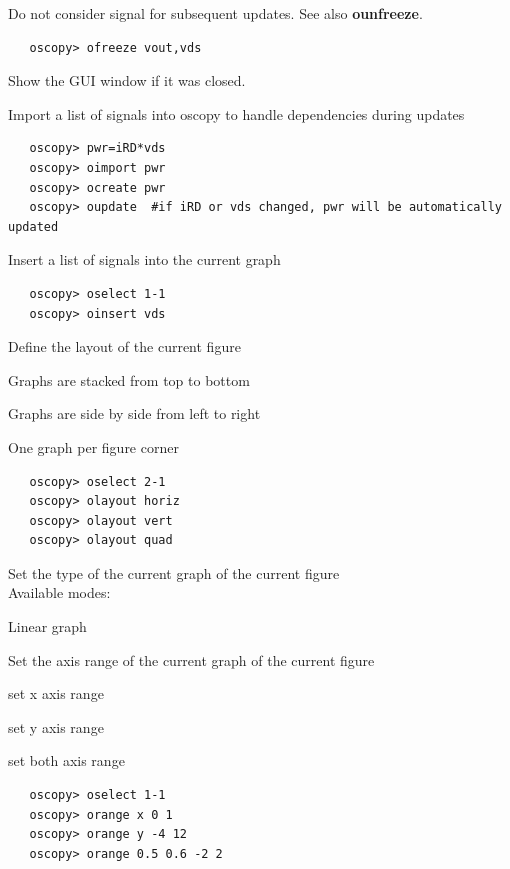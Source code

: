 \documentclass[a4paper,11pt]{report}
\renewenvironment{description}{%
\begin{basedescript}{%
\renewcommand{\makelabel}[1]{\bfseries##1}%
}%
}{%
\end{basedescript}%
}
\begin{document}
   Do not consider signal for subsequent updates. See also \textbf{ounfreeze}.
\begin{lstlisting}
   oscopy> ofreeze vout,vds
\end{lstlisting}

   Show the GUI window if it was closed.

   Import a list of signals into oscopy to handle dependencies during updates
\begin{lstlisting}
   oscopy> pwr=iRD*vds
   oscopy> oimport pwr
   oscopy> ocreate pwr
   oscopy> oupdate  #if iRD or vds changed, pwr will be automatically updated
\end{lstlisting}

   Insert a list of signals into the current graph
\begin{lstlisting}
   oscopy> oselect 1-1
   oscopy> oinsert vds
\end{lstlisting}

   Define the layout of the current figure
   \begin{description}
   \item[olayout horiz] Graphs are stacked from top to bottom
   \item[olayout vert] Graphs are side by side from left to right
   \item[olayout quad] One graph per figure corner
   \end{description}
\begin{lstlisting}
   oscopy> oselect 2-1
   oscopy> olayout horiz
   oscopy> olayout vert
   oscopy> olayout quad
\end{lstlisting}

   Set the type of the current graph of the current figure\\
   Available modes:
   \begin{description}
   \item[omode lin]      Linear graph
   \end{description}

   Set the axis range of the current graph of the current figure
   \begin{description}
   \item[orange x xmin xmax] set x axis range
   \item[orange y ymin ymax] set y axis range
   \item[orange xmin xmax ymin ymax] set both axis range
   \end{description}
\begin{lstlisting}
   oscopy> oselect 1-1
   oscopy> orange x 0 1
   oscopy> orange y -4 12
   oscopy> orange 0.5 0.6 -2 2
\end{lstlisting}
\end{document}
